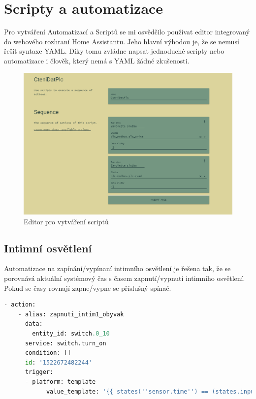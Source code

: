 \documentclass[a4paper,12pt,czech,bibliography=totoc]{scrbook}
\begin{document}
\section{Scripty a automatizace}
Pro vytváření Automatizací a Scriptů se mi osvědčilo používat editor integrovaný do webového rozhraní Home Assistantu. Jeho hlavní výhodou je, že se nemusí řešit syntaxe YAML. Díky tomu zvládne napsat jednoduché scripty nebo automatizace i člověk, který nemá s YAML žádné zkušenosti.
	\begin{figure}[h]
		\centering
		\includegraphics[scale = 0.3]{scriptEditor.PNG}
		\caption{Editor pro vytváření scriptů}
		\label{fig:my_label}
	\end{figure}
	\subsection{Intimní osvětlení}
	Automatizace na zapínání/vypínaní intimního osvětlení je řešena tak, že se porovnává aktuální systémový čas s časem zapnutí/vypnutí intimního osvětlení. Pokud se časy rovnají  zapne/vypne se příslušný spínač. 
	\newpage
		\begin{lstlisting}[language=Python]
- action:
	- alias: zapnuti_intim1_obyvak
	  data:
		entity_id: switch.0_10
	  service: switch.turn_on  
      condition: []
      id: '1522672482244'
      trigger:
      - platform: template
	  		value_template: '{{ states(''sensor.time'') == (states.input_datetime.obyvak_intim1_od.attributes.timestamp| int | timestamp_custom(''%H:%M'', False)) }}'

	\end{lstlisting}
\end{document}
